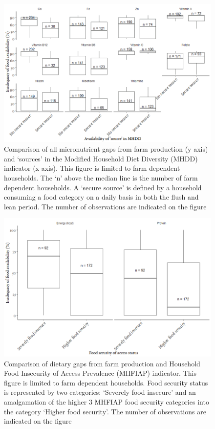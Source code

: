 \begin{figure}[H]
\includegraphics[width=1\textwidth]{Appendix/Ch6_1.png}
  \captionsetup{singlelinecheck = false, justification=justified} %
  \caption{Comparison of all micronutrient gaps from farm production (y axis) and `sources' in the Modified Household Diet Diversity (MHDD) indicator (x axis). This figure is limited to farm dependent households. The `n' above the median line is the number of farm dependent households. A `secure source' is defined by a household consuming a food category on a daily basis in both the flush and lean period. The number of observations are indicated on the figure}
  \label{fig:A_1}
\end{figure}

\begin{figure}[H]
\includegraphics[width=1\textwidth]{Appendix/Ch6_2.png}
  \captionsetup{singlelinecheck = false, justification=justified} %
  \caption{Comparison of dietary gaps from farm production and Household Food Insecurity of Access Prevalence (MHFIAP) indicator. This figure is limited to farm dependent households. Food security status is represented by two categories: `Severely food insecure' and an amalgamation of the higher 3 MHFIAP food security categories into the category `Higher food security'. The number of observations are indicated on the figure}
  \label{fig:A_2}
\end{figure}



